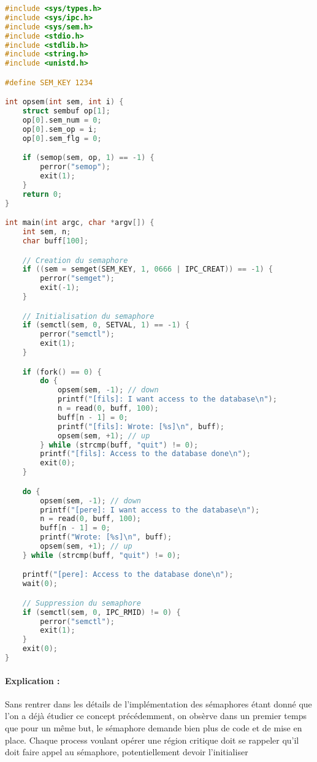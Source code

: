 \begin{mdframed}[style=mystyle]
\begin{lstlisting}[language=C, caption={Code C avec sémaphore}]
#include <sys/types.h>
#include <sys/ipc.h>
#include <sys/sem.h>
#include <stdio.h>
#include <stdlib.h>
#include <string.h>
#include <unistd.h>

#define SEM_KEY 1234

int opsem(int sem, int i) {
    struct sembuf op[1];
    op[0].sem_num = 0;
    op[0].sem_op = i;
    op[0].sem_flg = 0;

    if (semop(sem, op, 1) == -1) {
        perror("semop");
        exit(1);
    }
    return 0;
}

int main(int argc, char *argv[]) {
    int sem, n;
    char buff[100];

    // Creation du semaphore
    if ((sem = semget(SEM_KEY, 1, 0666 | IPC_CREAT)) == -1) {
        perror("semget");
        exit(-1);
    }

    // Initialisation du semaphore
    if (semctl(sem, 0, SETVAL, 1) == -1) {
        perror("semctl");
        exit(1);
    }

    if (fork() == 0) {
        do {
            opsem(sem, -1); // down
            printf("[fils]: I want access to the database\n");
            n = read(0, buff, 100);
            buff[n - 1] = 0;
            printf("[fils]: Wrote: [%s]\n", buff);
            opsem(sem, +1); // up
        } while (strcmp(buff, "quit") != 0);
        printf("[fils]: Access to the database done\n");
        exit(0);
    }

    do {
        opsem(sem, -1); // down
        printf("[pere]: I want access to the database\n");
        n = read(0, buff, 100);
        buff[n - 1] = 0;
        printf("Wrote: [%s]\n", buff);
        opsem(sem, +1); // up
    } while (strcmp(buff, "quit") != 0);

    printf("[pere]: Access to the database done\n");
    wait(0);

    // Suppression du semaphore
    if (semctl(sem, 0, IPC_RMID) != 0) {
        perror("semctl");
        exit(1);
    }
    exit(0);
}
\end{lstlisting}
\end{mdframed}

\paragraph{Explication :}
Sans rentrer dans les détails de l'implémentation des sémaphores étant donné que l'on a déjà étudier ce concept précédemment, on obsèrve dans un premier temps que pour un même but, le sémaphore demande bien plus de code et de mise en place. Chaque process voulant opérer une région critique doit se rappeler qu'il doit faire appel au sémaphore, potentiellement devoir l'initialiser

